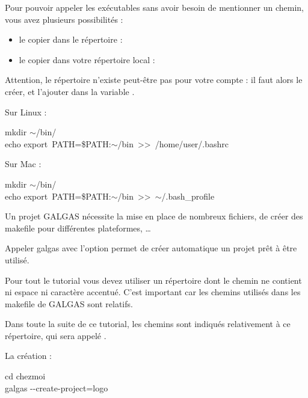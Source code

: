 Pour pouvoir appeler les exécutables sans avoir besoin de mentionner un chemin, vous avez plusieurs possibilités :
\begin{itemize}
  \item le copier dans le répertoire  :  
  \item le copier dans votre répertoire local  : 
\end{itemize}

Attention, le répertoire  n'existe peut-être pas pour votre compte : il faut alors le créer, et l'ajouter dans la variable .

Sur Linux :
\begin{SHELL}
mkdir $\sim$/bin/\\
echo \textquotesingle export~PATH=\$PATH{}:$\sim$/bin\textquotesingle~\textgreater{}\textgreater~/home/user/.bashrc
\end{SHELL}

Sur Mac :
\begin{SHELL}
mkdir $\sim$/bin/\\
echo \textquotesingle export~PATH=\$PATH{}:$\sim$/bin\textquotesingle~\textgreater{}\textgreater~$\sim$/.bash\_profile
\end{SHELL}














Un projet GALGAS nécessite la mise en place de nombreux fichiers, de créer des makefile pour différentes plateformes, … 

Appeler galgas avec l'option  permet de créer automatique un projet prêt à être utilisé.

Pour tout le tutorial vous devez utiliser un répertoire dont le chemin ne contient ni espace ni caractère accentué. C'est important car les chemins utilisés dans les makefile de GALGAS sont relatifs.

Dans toute la suite de ce tutorial, les chemins sont indiqués relativement à ce répertoire, qui sera appelé .

La création :
\begin{SHELL}
cd chezmoi\\
galgas -{}-create-project=logo
\end{SHELL}

